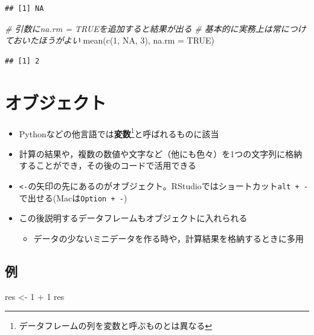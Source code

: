 \documentclass[
  xelatex,ja=standard, b5paper]{bxjsbook}
\newenvironment{Shaded}{\begin{snugshade}}{\end{snugshade}}
\newcommand{\AttributeTok}[1]{\textcolor[rgb]{0.77,0.63,0.00}{#1}}
\newcommand{\CommentTok}[1]{\textcolor[rgb]{0.56,0.35,0.01}{\textit{#1}}}
\newcommand{\ConstantTok}[1]{\textcolor[rgb]{0.00,0.00,0.00}{#1}}
\newcommand{\DecValTok}[1]{\textcolor[rgb]{0.00,0.00,0.81}{#1}}
\newcommand{\FunctionTok}[1]{\textcolor[rgb]{0.00,0.00,0.00}{#1}}
\newcommand{\NormalTok}[1]{#1}
\newcommand{\OtherTok}[1]{\textcolor[rgb]{0.56,0.35,0.01}{#1}}
\newcommand{\SpecialCharTok}[1]{\textcolor[rgb]{0.00,0.00,0.00}{#1}}
\providecommand{\tightlist}{%
  \setlength{\itemsep}{0pt}\setlength{\parskip}{0pt}}
\begin{document}
\begin{verbatim}
## [1] NA
\end{verbatim}

\begin{Shaded}
\begin{Highlighting}[]
\CommentTok{\# 引数にna.rm = TRUEを追加すると結果が出る}
\CommentTok{\# 基本的に実務上は常につけておいたほうがよい}
\FunctionTok{mean}\NormalTok{(}\FunctionTok{c}\NormalTok{(}\DecValTok{1}\NormalTok{, }\ConstantTok{NA}\NormalTok{, }\DecValTok{3}\NormalTok{), }\AttributeTok{na.rm =} \ConstantTok{TRUE}\NormalTok{)}
\end{Highlighting}
\end{Shaded}

\begin{verbatim}
## [1] 2
\end{verbatim}

\hypertarget{p-object}{%
\section{オブジェクト}\label{p-object}}

\begin{itemize}
\tightlist
\item
  Pythonなどの他言語では\textbf{変数}\footnote{データフレームの列を変数と呼ぶものとは異なる}と呼ばれるものに該当
\item
  計算の結果や，複数の数値や文字など（他にも色々）を1つの文字列に格納することができ，その後のコードで活用できる
\item
  \texttt{\textless{}-}の矢印の先にあるのがオブジェクト。RStudioではショートカット\texttt{alt\ +\ -}で出せる(Macは\texttt{Option\ +\ -})
\item
  この後説明するデータフレームもオブジェクトに入れられる

  \begin{itemize}
  \tightlist
  \item
    データの少ないミニデータを作る時や，計算結果を格納するときに多用
  \end{itemize}
\end{itemize}

\hypertarget{p-object-ex}{%
\subsection{例}\label{p-object-ex}}

\begin{Shaded}
\begin{Highlighting}[]
\NormalTok{res }\OtherTok{\textless{}{-}} \DecValTok{1} \SpecialCharTok{+} \DecValTok{1}
\NormalTok{res}
\end{Highlighting}
\end{Shaded}
\end{document}
